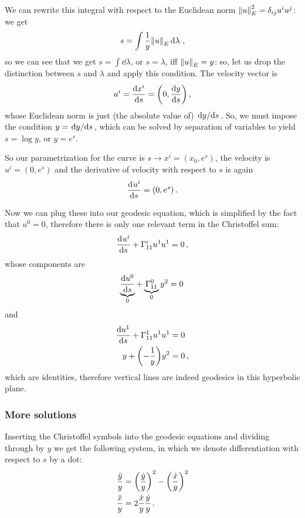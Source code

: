 \documentclass[main.tex]{subfiles}
\begin{document}
We can rewrite this integral with respect to the Euclidean norm \(\norm{u}_E^2 = \delta_{ij} u^{i} u^{j}\): we get 
%
\begin{align}
  s = \int \frac{1}{y} \norm{u}_E \dd{\lambda }
\,,
\end{align}
%
so we can see that we get \(s = \int \dd{\lambda }\), or \(s = \lambda \), iff \(\norm{u}_E = y\): so, let us drop the distinction between \(s\) and \(\lambda \) and apply this condition.
The velocity vector is 
%
\begin{align}
  u^{i} = \dv{x^{i}}{s} = \qty(0, \dv{y}{s})
\,,
\end{align}
%
whose Euclidean norm is just (the absolute value of) \(\dv*{y}{s}\). 
So, we must impose the condition \(y = \dv*{y}{s}\), which can be solved by separation of variables to yield \(s = \log y\), or \(y = e^{s}\). 

So our parametrization for the curve is \(s \rightarrow x^{i} = (x_0, e^{s})\), the velocity is \(u^{i} = (0, e^{s})\) and the derivative of velocity with respect to \(s\) is again 
%
\begin{align}
  \dv[]{u^{i}}{s} = (0, e^{s})
\,.
\end{align}

Now we can plug these into our geodesic equation, which is simplified by the fact that \(u^{0} = 0\), therefore there is only one relevant term in the Christoffel sum: 
%
\begin{align}
  \dv[]{ u^{i}}{s} + \Gamma^{i}_{11} u^{1} u^{1} = 0
\,,
\end{align}
%
whose components are 
%
\begin{align}
  \underbrace{\dv{ u^{0}}{s}}_{0} + \underbrace{\Gamma^{0}_{11}}_{0} y^2 = 0
\,
\end{align}
%
and 
%
\begin{subequations}
  \begin{align}
    \dv{ u^{1}}{s} + \Gamma^{1}_{11} u^{1} u^{1} &= 0  \\
    y + \qty(- \frac{1}{y}) y^2 &=0
    \,,
  \end{align}
\end{subequations}
%
which are identities, therefore vertical lines are indeed geodesics in this hyperbolic plane.

\subsubsection{More solutions}

Inserting the Christoffel symbols into the geodesic equations and dividing through by \(y\) we get the following system, in which we denote differentiation with respect to \(s\) by a dot: 
%
\begin{subequations}
\begin{align}
  \frac{\ddot{y}}{y} &= \qty(\frac{\dot{y}}{y})^2 - \qty(\frac{\dot{x}}{y})^2  \\
  \frac{\ddot{x}}{y} &= 2 \frac{\dot{x}}{y} \frac{\dot{y}}{y} 
\,.
\end{align}
\end{subequations}
\end{document}

